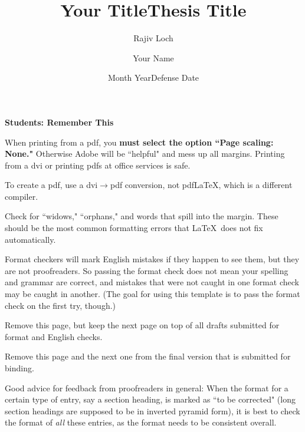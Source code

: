 \documentclass[12pt]{report}
\title{Your Title}
\author{Rajiv Loch}
\date{Month Year}
\title{Thesis Title}
\author{Your Name}
\date{Defense Date}
\renewenvironment{itemize}{%
\vspace{-.15in} %
    \begin{olditemize}%
\setlength{\parsep}{0ex}
\setlength{\topsep}{0ex}
\setlength{\partopsep}{0ex}
      \setlength{\parskip}{0pt}%
      \setlength{\itemsep}{0pt}%
  }%
  {%
    \end{olditemize}%
  }
\numberwithin{equation}{chapter}
\begin{document}
\thispagestyle{empty}


\begin{singlespace}

\centerline{\bf \Large Students: Remember This}



\begin{itemize}
\item
When printing from a pdf, you {\bf must select the option
``Page scaling: None."} Otherwise Adobe will be ``helpful" and
mess up all margins. Printing from a dvi or printing pdfs
at office services is safe.

\item
To create a pdf, use a dvi$\to $pdf conversion, not pdf\LaTeX, which is a
different compiler.


\item
Check for ``widows," ``orphans," and words that spill into the margin.
These should be the most common formatting errors that \LaTeX \
does not fix automatically.

\item
Format checkers will mark English mistakes if they happen to see them,
but they are not proofreaders. So passing the format check does not
mean your spelling and grammar are correct, and mistakes that were
not caught in one format check may be caught in another.
(The goal for using this template is to
pass the format check on the first try, though.)

\item
Remove this page, but keep the next
page on top of all drafts submitted for
format and English checks.

\item
Remove this page and the next one from the final version
that is submitted for binding.


\end{itemize}


Good advice for feedback from proofreaders in general:
When the format for a certain type of entry, say a section heading,
is marked as ``to be corrected" (long section headings are supposed
to be in inverted pyramid form), it is best to
check the format of {\em all} these entries, as
the format needs to be
consistent overall.


\end{singlespace}




\clearpage

\thispagestyle{empty}
\end{document}
